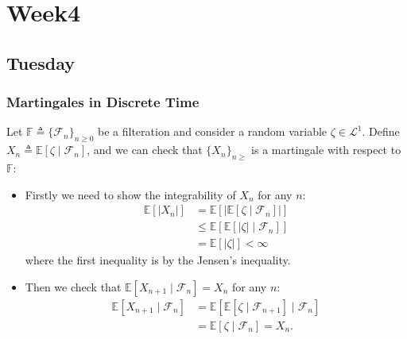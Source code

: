 
\chapter{Week4}

\section{Tuesday}


\subsection{Martingales in Discrete Time}

\begin{example}
Let $\mathbb{F}\triangleq\{\mathcal{F}_n\}_{n\ge0}$ be a filteration and consider a random variable 
$\zeta\in\mathcal{L}^1$.
Define $X_n\triangleq\mathbb{E}[\zeta\mid\mathcal{F}_n]$, and we can check that 
$\{X_n\}_{n\ge}$ is a martingale with respect to $\mathbb{F}$:
\begin{itemize}
\item
Firstly we need to show the integrability of $X_n$ for any $n$:
\begin{align*}
\mathbb{E}[|X_n|]&=\mathbb{E}[|\mathbb{E}[\zeta\mid\mathcal{F}_n]|]\\
&\le \mathbb{E}[\mathbb{E}[|\zeta|\mid\mathcal{F}_n]]\\
&=\mathbb{E}[|\zeta|]<\infty
\end{align*}
where the first inequality is by the Jensen's inequality.
\item
Then we check that $\mathbb{E}[X_{n+1}\mid\mathcal{F}_n]=X_n$ for any $n$:
\begin{align*}
\mathbb{E}[X_{n+1}\mid\mathcal{F}_n]&=\mathbb{E}[\mathbb{E}[\zeta\mid\mathcal{F}_{n+1}]\mid\mathcal{F}_n]\\
&=\mathbb{E}[\zeta\mid\mathcal{F}_n]=X_n.
\end{align*}
\end{itemize}
\end{example}

